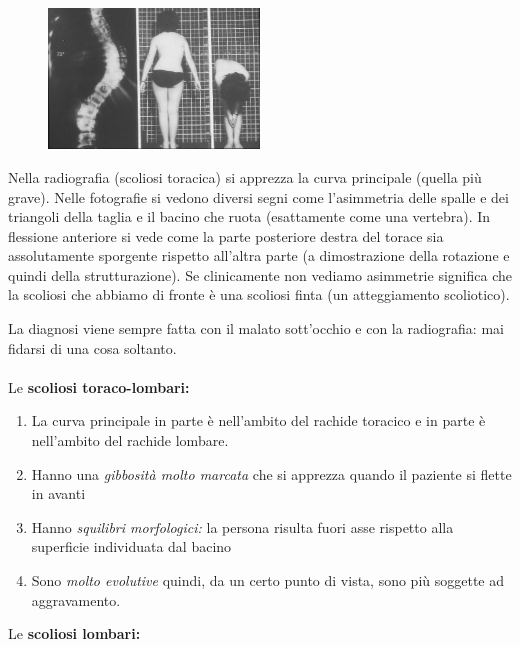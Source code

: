 \begin{figure}[!ht]
\centering
	\includegraphics[width=0.5\textwidth]{012/image14.jpeg}
\end{figure}

Nella radiografia (scoliosi toracica) si apprezza la curva principale
(quella più grave). Nelle fotografie si vedono diversi segni come
l'asimmetria delle spalle e dei triangoli della taglia e il bacino che
ruota (esattamente come una vertebra). In flessione anteriore si vede
come la parte posteriore destra del torace sia assolutamente sporgente
rispetto all'altra parte (a dimostrazione della rotazione e quindi della
strutturazione). Se clinicamente non vediamo asimmetrie significa che la
scoliosi che abbiamo di fronte è una scoliosi finta (un atteggiamento
scoliotico).

La diagnosi viene sempre fatta con il malato sott'occhio e con la
radiografia: mai fidarsi di una cosa soltanto.
\\\\
Le \textbf{scoliosi toraco-lombari:}

\begin{enumerate}
\def\labelenumi{\arabic{enumi}.}
\item
  La curva principale in parte è nell'ambito del rachide toracico e in
  parte è nell'ambito del rachide lombare.
\item 
  Hanno una \emph{gibbosità molto marcata} che si apprezza quando il
  paziente si flette in avanti
\item 
  Hanno \emph{squilibri morfologici:} la persona risulta fuori asse
  rispetto alla superficie individuata dal bacino
\item 
  Sono \emph{molto evolutive} quindi, da un certo punto di vista, sono
  più soggette ad aggravamento.
\end{enumerate}

Le \textbf{scoliosi lombari: }

